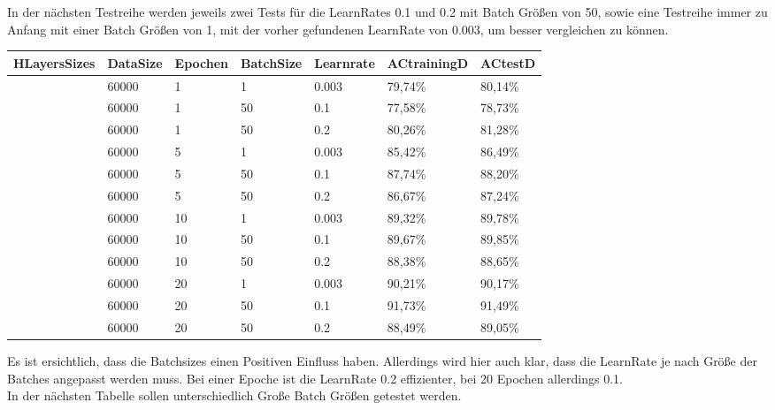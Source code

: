 \documentclass[12pt]{article}
\begin{document}
In der nächsten Testreihe werden jeweils zwei Tests für die LearnRates 0.1 und 0.2 mit Batch Größen von 50, sowie eine Testreihe immer zu Anfang mit einer Batch Größen von 1, mit der vorher gefundenen LearnRate von 0.003, um besser vergleichen zu können. 

\begin{table}[H]
    \centering
    \begin{tabular}{|l|l|l|l|l|l|l|}
    \hline
        HLayersSizes & DataSize & Epochen & BatchSize & Learnrate & ACtrainingD & ACtestD \\ \hline
        [784, 100, 10] & 60000 & 1 & 1 & 0.003 & 79,74\% & 80,14\% \\ \hline
        [784, 100, 10] & 60000 & 1 & 50 & 0.1 & 77,58\% & 78,73\% \\ \hline
        [784, 100, 10] & 60000 & 1 & 50 & 0.2 & 80,26\% & 81,28\% \\ \hline
        [784, 100, 10] & 60000 & 5 & 1 & 0.003 & 85,42\% & 86,49\% \\ \hline
        [784, 100, 10] & 60000 & 5 & 50 & 0.1 & 87,74\% & 88,20\% \\ \hline
        [784, 100, 10] & 60000 & 5 & 50 & 0.2 & 86,67\% & 87,24\% \\ \hline
        [784, 100, 10] & 60000 & 10 & 1 & 0.003 & 89,32\% & 89,78\% \\ \hline
        [784, 100, 10] & 60000 & 10 & 50 & 0.1 & 89,67\% & 89,85\% \\ \hline
        [784, 100, 10] & 60000 & 10 & 50 & 0.2 & 88,38\% & 88,65\% \\ \hline
        [784, 100, 10] & 60000 & 20 & 1 & 0.003 & 90,21\% & 90,17\% \\ \hline
        [784, 100, 10] & 60000 & 20 & 50 & 0.1 & 91,73\% & 91,49\% \\ \hline
        [784, 100, 10] & 60000 & 20 & 50 & 0.2 & 88,49\% & 89,05\% \\ \hline
    \end{tabular}
\end{table}
Es ist ersichtlich, dass die Batchsizes einen Positiven Einfluss haben. Allerdings wird hier auch klar, dass die LearnRate je nach Größe der Batches angepasst werden muss. Bei einer Epoche ist die LearnRate 0.2 effizienter, bei 20 Epochen allerdings 0.1. \\
In der nächsten Tabelle sollen unterschiedlich Große Batch Größen getestet werden. 
\end{document}
